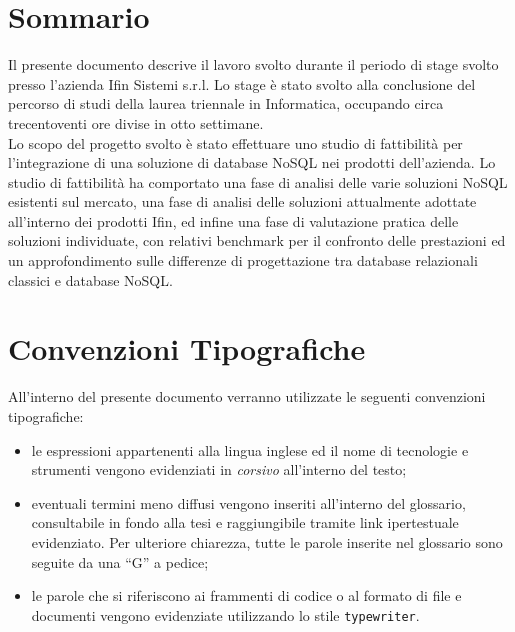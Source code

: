 
\cleardoublepage
{}
{}
\begingroup
\let\clearpage\relax
\let\cleardoublepage\relax
\let\cleardoublepage\relax

\chapter*{Sommario}

Il presente documento descrive il lavoro svolto durante il periodo di stage svolto presso l'azienda Ifin Sistemi s.r.l. Lo stage è stato svolto alla conclusione del percorso di studi della laurea triennale in Informatica, occupando circa trecentoventi ore divise in otto settimane.\\
Lo scopo del progetto svolto è stato effettuare uno studio di fattibilità per l’integrazione di una soluzione di database NoSQL nei prodotti dell'azienda. Lo studio di fattibilità ha comportato una fase di analisi delle varie soluzioni NoSQL esistenti sul mercato, una fase di analisi delle soluzioni attualmente adottate all'interno dei prodotti Ifin, ed infine una fase di valutazione pratica delle soluzioni individuate, con relativi benchmark per il confronto delle prestazioni ed un approfondimento sulle differenze di progettazione tra database relazionali classici e database NoSQL.

\vfill

\chapter*{Convenzioni Tipografiche}

All'interno del presente documento verranno utilizzate le seguenti convenzioni tipografiche:
\begin{itemize}
    \item le espressioni appartenenti alla lingua inglese ed il nome di tecnologie e strumenti vengono evidenziati in \textit{corsivo} all'interno del testo;
    \item eventuali termini meno diffusi vengono inseriti all'interno del glossario, consultabile in fondo alla tesi e raggiungibile tramite link ipertestuale \textcolor{bluelink}{evidenziato}. Per ulteriore chiarezza, tutte le parole inserite nel glossario sono seguite da una ``G'' a pedice;
    \item le parole che si riferiscono ai frammenti di codice o al formato di file e documenti vengono evidenziate utilizzando lo stile \texttt{typewriter}.
\end{itemize}


%
%

\endgroup			

\vfill

